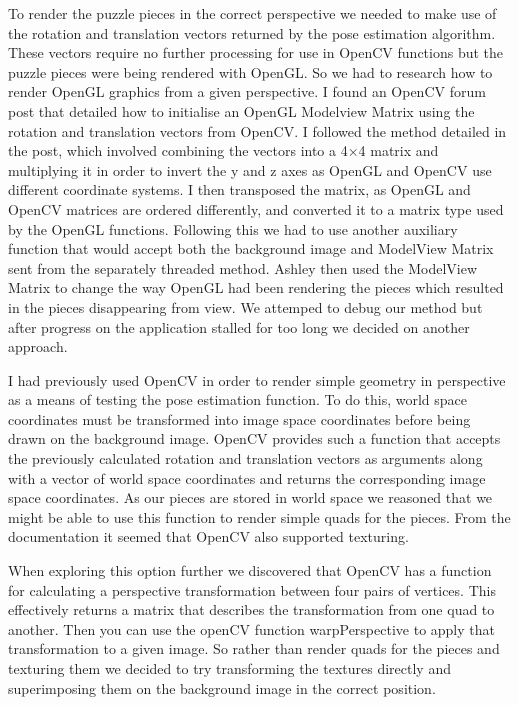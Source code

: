 \documentclass{article}
\begin{document}
To render the puzzle pieces in the correct perspective we needed to make use of the rotation and translation vectors returned by the pose estimation algorithm. These vectors require no further processing for use in OpenCV functions but the puzzle pieces were being rendered with OpenGL. So we had to research how to render OpenGL graphics from a given perspective. I found an OpenCV forum post that detailed how to initialise an OpenGL Modelview Matrix using the rotation and translation vectors from OpenCV. I followed the method detailed in the post, which involved combining the vectors into a 4$\times$4 matrix and multiplying it in order to invert the y and z axes as OpenGL and OpenCV use different coordinate systems. I then transposed the matrix, as OpenGL and OpenCV matrices are ordered differently, and converted it to a matrix type used by the OpenGL functions. Following this we had to use another auxiliary function that would accept both the background image and ModelView Matrix sent from the separately threaded method. Ashley then used the ModelView Matrix to change the way OpenGL had been rendering the pieces which resulted in the pieces disappearing from view. We attemped to debug our method but after progress on the application stalled for too long we decided on another approach. 


I had previously used OpenCV in order to render simple geometry in perspective as a means of testing the pose estimation function. To do this, world space coordinates must be transformed into image space coordinates before being drawn on the background image. OpenCV provides such a function that accepts the previously calculated rotation and translation vectors as arguments along with a vector of world space coordinates and returns the corresponding image space coordinates. As our pieces are stored in world space we reasoned that we might be able to use this function to render simple quads for the pieces. From the documentation it seemed that OpenCV also supported texturing. 

When exploring this option further we discovered that OpenCV has a function for calculating a perspective transformation between four pairs of vertices. This effectively returns a matrix that describes the transformation from one quad to another. Then you can use the openCV function warpPerspective to apply that transformation to a given image. So rather than render quads for the pieces and texturing them we decided to try transforming the textures directly and superimposing them on the background image in the correct position. 
\end{document}
